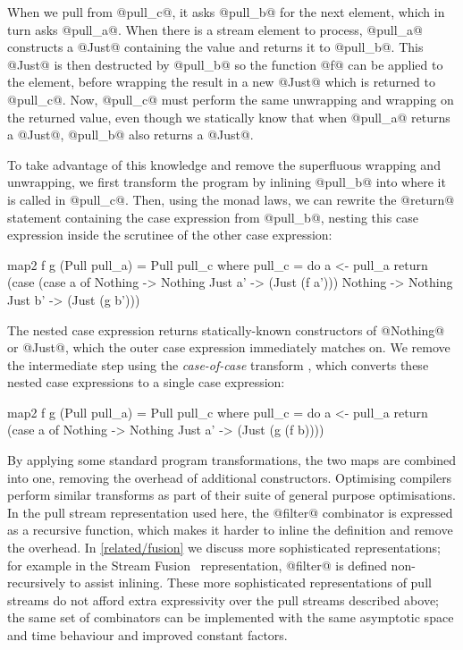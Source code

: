When we pull from @pull_c@, it asks @pull_b@ for the next element, which in turn asks @pull_a@.
When there is a stream element to process, @pull_a@ constructs a @Just@ containing the value and returns it to @pull_b@.
This @Just@ is then destructed by @pull_b@ so the function @f@ can be applied to the element, before wrapping the result in a new @Just@ which is returned to @pull_c@.
Now, @pull_c@ must perform the same unwrapping and wrapping on the returned value, even though we statically know that when @pull_a@ returns a @Just@, @pull_b@ also returns a @Just@.

To take advantage of this knowledge and remove the superfluous wrapping and unwrapping, we first transform the program by inlining @pull_b@ into where it is called in @pull_c@.
Then, using the monad laws, we can rewrite the @return@ statement containing the case expression from @pull_b@, nesting this case expression inside the scrutinee of the other case expression:

\begin{haskell}
map2 f g (Pull pull_a) = Pull pull_c
 where
  pull_c = do
    a <- pull_a
    return (case (case a of
                   Nothing -> Nothing
                   Just a' -> (Just (f a')))
             Nothing -> Nothing
             Just b' -> (Just (g b')))
\end{haskell}

The nested case expression returns statically-known constructors of @Nothing@ or @Just@, which the outer case expression immediately matches on.
We remove the intermediate step using the \emph{case-of-case} transform \cite{jones1998transformation}, which converts these nested case expressions to a single case expression:


\begin{haskell}
map2 f g (Pull pull_a) = Pull pull_c
 where
  pull_c = do
    a <- pull_a
    return (case a of
             Nothing -> Nothing
             Just a' -> (Just (g (f b))))
\end{haskell}

By applying some standard program transformations, the two maps are combined into one, removing the overhead of additional constructors.
Optimising compilers perform similar transforms as part of their suite of general purpose optimisations.
In the pull stream representation used here, the @filter@ combinator is expressed as a recursive function, which makes it harder to inline the definition and remove the overhead.
In \cref{related/fusion} we discuss more sophisticated representations; for example in the Stream Fusion~\cite{coutts2007stream} representation, @filter@ is defined non-recursively to assist inlining.
These more sophisticated representations of pull streams do not afford extra expressivity over the pull streams described above; the same set of combinators can be implemented with the same asymptotic space and time behaviour and improved constant factors.


